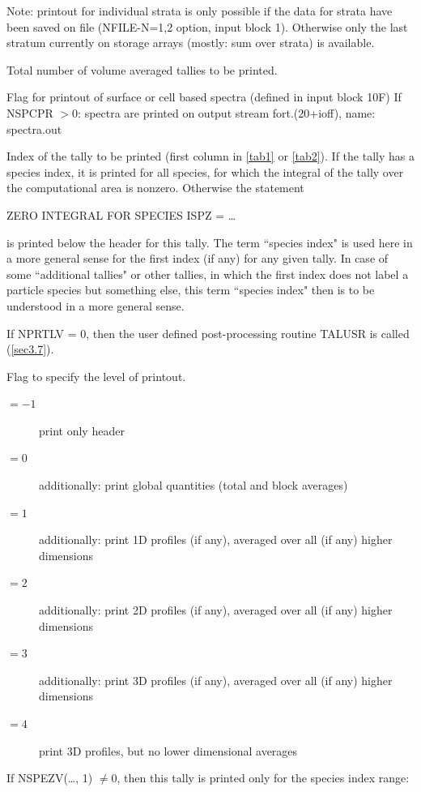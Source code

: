 \begin{description}
        Note: printout for individual strata is only possible if the data for strata
        have been saved on file (NFILE-N=1,2 option, input block 1).
        Otherwise only the last stratum currently on storage arrays (mostly:
        sum over strata) is available.
  \item[NVOLPR] Total number of volume averaged tallies to be printed.
  \item[NSPCPR] Flag for printout of surface or cell based spectra (defined in
        input block 10F) If NSPCPR $> 0$: spectra are printed on output stream
        fort.(20+ioff), name: spectra.out
  \item[NPRTLV] Index of the tally to be printed
        (first column in \cref{tab1} or \cref{tab2}).
        If the tally has a species index, it is printed for all species, for which the
        integral of the tally over the computational area is nonzero.
        Otherwise the statement

        ZERO INTEGRAL FOR SPECIES ISPZ = \dots

        is printed below the header for this tally.
        The term ``species index" is used here in a more general sense	for the first
        index (if any) for any given tally.
        In case of some ``additional tallies" or other tallies, in which the first
        index does not label a particle species but something else, this term ``species
        index" then is to be understood in a more general sense.

        If NPRTLV = 0, then the user defined post-processing routine TALUSR is called
        (\cref{sec3.7}).
  \item[NFLAGV] Flag to specify the level of printout.
        \begin{description}
          \item[$=-1$] print only header
          \item[$=0$] additionally: print global
                quantities (total and block averages)
          \item[$=1$] additionally: print 1D
                profiles (if any), averaged over all (if any) higher dimensions
          \item[$=2$]
                additionally: print 2D profiles (if any), averaged over all (if any) higher
                dimensions
          \item[$=3$] additionally: print 3D profiles (if any), averaged over
                all (if any) higher dimensions
          \item[$=4$] print 3D profiles, but no lower
                dimensional averages
        \end{description}
  \item[NSPEZV] If NSPEZV(\dots, 1) $\ne
          0$, then this tally is printed only for the species index range:


\end{description}
